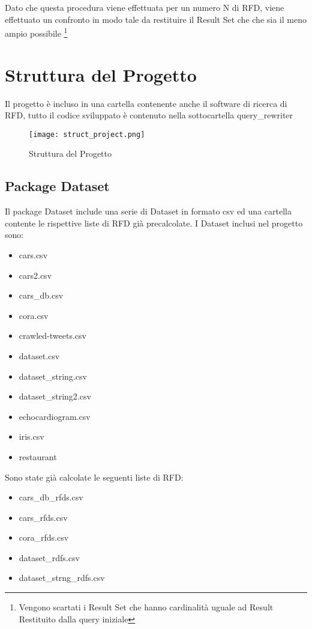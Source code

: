 Dato che questa procedura viene effettuata per un numero N di RFD, viene effettuato un confronto in modo tale da restituire il Result Set che che sia il meno ampio possibile \footnote{Vengono scartati i Result Set che hanno cardinalità uguale ad Result Restituito dalla query iniziale}

\section{Struttura del Progetto}
Il progetto è incluso in una cartella contenente anche il software di ricerca di RFD, tutto il codice sviluppato è contenuto nella sottocartella query{\_}rewriter
\begin{figure}[H]
    \centering
    \texttt{[image: struct\_project.png]}
    \caption{Struttura del Progetto}
    \label{fig:struct_project}
\end{figure}

\subsection{Package Dataset}
Il package Dataset include una serie di Dataset in formato csv ed una cartella contente le rispettive liste di RFD già precalcolate. 
I Dataset inclusi nel progetto sono:
\begin{itemize}[noitemsep]
\let\labelitemi\labelitemii
    \item cars.csv
    \item cars2.csv
    \item cars{\_}db.csv
    \item cora.csv
    \item crawled-tweets.csv
    \item dataset.csv
    \item dataset{\_}string.csv
    \item dataset{\_}string2.csv
    \item echocardiogram.csv
    \item iris.csv
    \item restaurant
\end{itemize}

Sono state già calcolate le seguenti liste di RFD:
\begin{itemize}[noitemsep]
\let\labelitemi\labelitemii
    \item cars{\_}db{\_}rfds.csv
    \item cars{\_}rfds.csv
    \item cora{\_}rfds.csv
    \item dataset{\_}rdfs.csv
    \item dataset{\_}strng{\_}rdfs.csv
\end{itemize}


